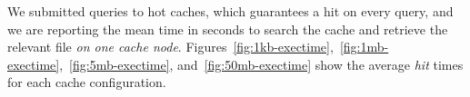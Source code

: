 We submitted queries to hot caches, which guarantees a hit on every query, and
we are reporting the mean time in seconds to search the cache and retrieve the
relevant file \textit{on one cache node}.
Figures~\ref{fig:1kb-exectime},~\ref{fig:1mb-exectime},~\ref{fig:5mb-exectime},
and~\ref{fig:50mb-exectime} show the average \textit{hit} times for each cache
configuration. 
\begin{figure}
\begin{center}
  \\
	\subfigure[Data Size = 5 MB]

\end{center}
\end{figure}
